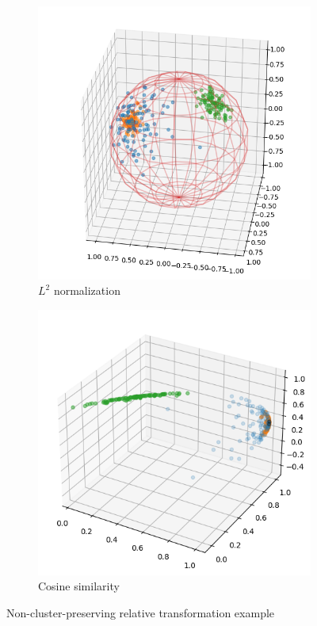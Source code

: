 \documentclass[../main.tex]{subfiles}
\begin{document}
\begin{figure}[ht!]
\begin{subfigure}[b]{0.45\textwidth}
         \includegraphics[width=\textwidth]{figures/rs/stitching/clusters_2.png}
        \caption{$L^2$ normalization}
         \label{fig:rel_ex_2}
     \end{subfigure}
     \begin{subfigure}[b]{0.45\textwidth}
         \centering
         \includegraphics[width=\textwidth]{figures/rs/stitching/clusters_3.png}
        \caption{Cosine similarity}
         \label{fig:rel_ex_3}
     \end{subfigure}
    \caption{Non-cluster-preserving relative transformation example}
    \label{fig:rel_ex_bad}
\end{figure}
\end{document}

